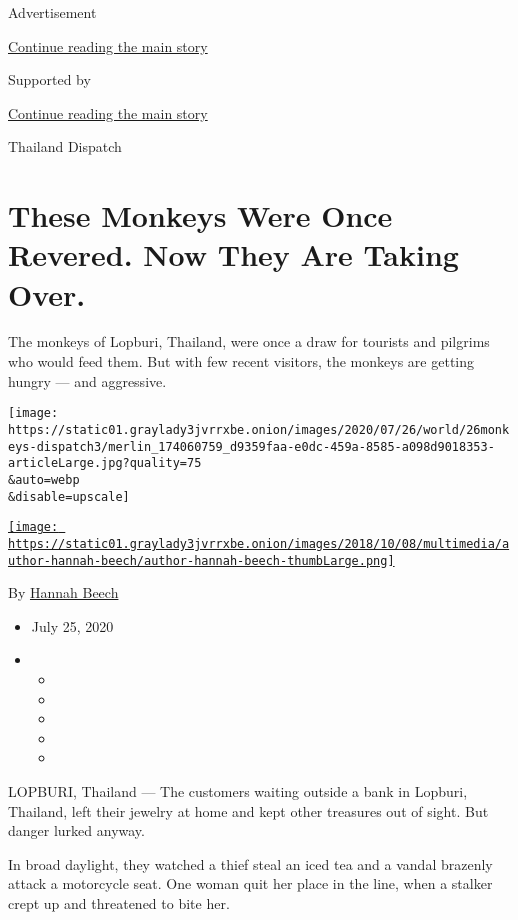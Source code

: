 Advertisement

\protect\hyperlink{after-top}{Continue reading the main story}

Supported by

\protect\hyperlink{after-sponsor}{Continue reading the main story}

Thailand Dispatch

\hypertarget{these-monkeys-were-once-revered-now-they-are-taking-over}{%
\section{These Monkeys Were Once Revered. Now They Are Taking
Over.}\label{these-monkeys-were-once-revered-now-they-are-taking-over}}

The monkeys of Lopburi, Thailand, were once a draw for tourists and
pilgrims who would feed them. But with few recent visitors, the monkeys
are getting hungry --- and aggressive.

\texttt{[image: https://static01.graylady3jvrrxbe.onion/images/2020/07/26/world/26monkeys-dispatch3/merlin\_174060759\_d9359faa-e0dc-459a-8585-a098d9018353-articleLarge.jpg?quality=75\\\&auto=webp\\\&disable=upscale]}

\href{https://www.nytimes3xbfgragh.onion/by/hannah-beech}{\texttt{[image: https://static01.graylady3jvrrxbe.onion/images/2018/10/08/multimedia/author-hannah-beech/author-hannah-beech-thumbLarge.png]}}

By \href{https://www.nytimes3xbfgragh.onion/by/hannah-beech}{Hannah
Beech}

\begin{itemize}
\item
  July 25, 2020
\item
  \begin{itemize}
  \item
  \item
  \item
  \item
  \item
  \end{itemize}
\end{itemize}

LOPBURI, Thailand --- The customers waiting outside a bank in Lopburi,
Thailand, left their jewelry at home and kept other treasures out of
sight. But danger lurked anyway.

In broad daylight, they watched a thief steal an iced tea and a vandal
brazenly attack a motorcycle seat. One woman quit her place in the line,
when a stalker crept up and threatened to bite her.

